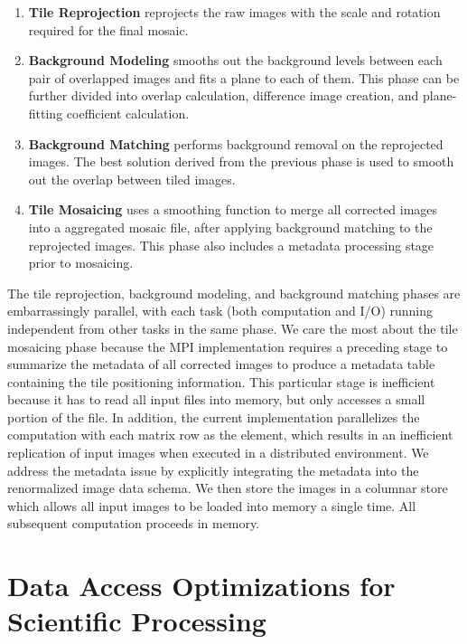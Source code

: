 \documentclass{acm_proc_article-sp}
\begin{document}
\begin{enumerate}
\item \textbf{Tile Reprojection} reprojects the raw images with the scale and rotation required for the
final mosaic. 
\item \textbf{Background Modeling} smooths out the background levels between each pair of
overlapped images and fits a plane to each of them. This phase can be further divided into overlap
calculation, difference image creation, and plane-fitting coefficient calculation.
\item \textbf{Background Matching} performs background \linebreak removal on the
reprojected images. The best solution derived from the previous phase is used to smooth out the overlap between
tiled images.
\item \textbf{Tile Mosaicing} uses a smoothing function to merge all corrected images into a aggregated mosaic file,
after applying background matching to the reprojected images. This phase also includes a metadata processing
stage prior to mosaicing.
\end{enumerate}

The tile reprojection, background modeling, and background matching phases are embarrassingly
parallel, with each task (both computation and I/O) running independent from other tasks in the same
phase. We care the most about the tile mosaicing phase because the MPI implementation requires a preceding
stage to summarize the metadata of all corrected images to produce a metadata table containing the tile
positioning information. This particular stage is inefficient because it has to read all input files into memory, but
only accesses a small portion of the file. In addition, the current implementation parallelizes the computation with
each matrix row as the element, which results in an inefficient replication of input images when executed in a
distributed environment. We address the metadata issue by explicitly integrating the metadata into the
renormalized image data schema. We then store the images in a columnar store which allows all input images to
be loaded into memory a single time. All subsequent computation proceeds in memory.

\section{Data Access Optimizations for \\ Scientific Processing}
\label{sec:optimizations-scientific-processing}
\end{document}
